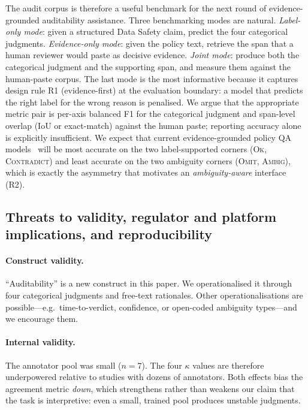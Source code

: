 \documentclass[11pt,a4paper]{article}
\newcommand{\dgrule}[1]{\textsf{R#1}}
\begin{document}
The audit corpus is therefore a useful benchmark for the next round
of evidence-grounded auditability assistance. Three benchmarking modes
are natural. \emph{Label-only mode}: given a structured Data Safety
claim, predict the four categorical judgments. \emph{Evidence-only
mode}: given the policy text, retrieve the span that a human reviewer
would paste as decisive evidence. \emph{Joint mode}: produce both the
categorical judgment and the supporting span, and measure them against
the human-paste corpus. The last mode is the most informative because
it captures design rule \dgrule{1} (evidence-first) at the evaluation
boundary: a model that predicts the right label for the wrong reason
is penalised. We argue that the appropriate metric pair is per-axis
balanced F1 for the categorical judgment and span-level overlap (IoU
or exact-match) against the human paste; reporting accuracy alone is
explicitly insufficient. We expect that current evidence-grounded
policy QA models~\citep{ravichander2019question} will be most accurate
on the two label-supported corners (\textsc{Ok},
\textsc{Contradict}) and least accurate on the two ambiguity corners
(\textsc{Omit}, \textsc{Ambig}), which is exactly the asymmetry that
motivates an \emph{ambiguity-aware} interface (\dgrule{2}).

\subsection{Threats to validity, regulator and platform implications, and reproducibility}
\label{sec:disc-validity}
\paragraph{Construct validity.}
``Auditability'' is a new construct in this paper. We operationalised
it through four categorical judgments and free-text rationales. Other
operationalisations are possible---e.g.\ time-to-verdict, confidence,
or open-coded ambiguity types---and we encourage them.

\paragraph{Internal validity.}
The annotator pool was small ($n=7$). The four $\kappa$ values are
therefore underpowered relative to studies with dozens of annotators.
Both effects bias the agreement metric \emph{down}, which strengthens
rather than weakens our claim that the task is interpretive: even a
small, trained pool produces unstable judgments.
\end{document}
